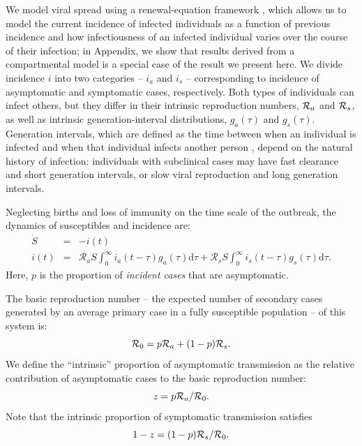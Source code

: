 We model viral spread using a renewal-equation framework \citep{heesterbeek1996concept}, which allows us to model the current incidence of infected individuals as a function of previous incidence and how infectiousness of an infected individual varies over the course of their infection;
in Appendix, we show that results derived from a compartmental model is a special case of the result we present here.
We divide incidence $i$ into two categories -- $i_a$ and $i_s$ -- corresponding to incidence of asymptomatic and symptomatic cases, respectively.
Both types of individuals can infect others, but they differ in their intrinsic reproduction numbers, ${\cal{R}}_a$ and ${\cal{R}}_s$, as well as intrinsic generation-interval distributions, $g_a(\tau)$ and $g_s(\tau)$.
Generation intervals, which are defined as the time between when an individual is infected and when that individual infects another person \citep{svensson2007note}, depend on the natural history of infection:
individuals with subclinical cases may have fast clearance and short generation intervals, or slow viral reproduction and long generation intervals.

Neglecting births and loss of immunity on the time scale of the outbreak, the dynamics of susceptibles and incidence are:
\begin{eqnarray}
\dot{S}&=&-i(t) \\
i(t)&=&\mathcal R_a S \int_0^\infty i_a(t-\tau) g_a(\tau) \mathrm{d}\tau + \mathcal R_s S \int_0^\infty i_s(t-\tau) g_s(\tau) \mathrm{d}\tau.
\end{eqnarray}
Here, $p$ is the proportion of \emph{incident cases} that are asymptomatic.

The basic reproduction number -- the expected number of secondary cases generated by an average primary case in a fully susceptible population \citep{anderson1992infectious} -- of this system is:
\begin{equation}
{\cal{R}}_{0}= p {\cal{R}}_a + (1-p) {\cal{R}}_s.
\end{equation}
We define the ``intrinsic'' proportion of asymptomatic transmission as the relative contribution of asymptomatic cases to the basic reproduction number:
\begin{equation}
z = p {\cal{R}}_a/{\cal{R}}_{0}.
\end{equation}
Note that the intrinsic proportion of symptomatic transmission satisfies
\begin{equation}
1-z = (1-p) {\cal{R}}_s/{\cal{R}}_{0}.
\end{equation}

